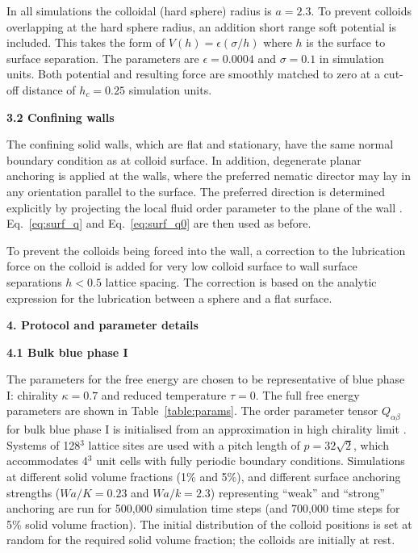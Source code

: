 \documentclass[12pt,twoside]{article}
\begin{document}
In all simulations the colloidal (hard sphere) radius is $a = 2.3$. To
prevent colloids overlapping at the hard sphere radius, an addition
short range soft potential is included. This takes the form of
$V(h) = \epsilon (\sigma/h)$ where $h$ is the surface to surface separation.
The parameters are $\epsilon = 0.0004$ and $\sigma = 0.1$ in simulation
units. Both potential and resulting force are smoothly matched to zero at
a cut-off distance of $h_c = 0.25$ simulation units.

{\bf 3.2 Confining walls}

The confining solid walls, which are flat and stationary, have the
same normal boundary condition as at colloid surface. In addition,
degenerate planar anchoring is applied at the walls, where the
preferred nematic director may lay in any orientation parallel
to the surface. The preferred direction is determined explicitly
by projecting the local fluid order parameter to the plane of the
wall \cite{fournier2005}. Eq.~\ref{eq:surf_q} and Eq.~\ref{eq:surf_q0}
are then used as before.

To prevent the colloids being forced into the wall, a correction
to the lubrication force on the colloid is added for very low colloid
surface to wall surface separations $h < 0.5$ lattice spacing. The
correction is based on the analytic expression for the lubrication
between a sphere and a flat surface.

{\bf 4. Protocol and parameter details}


{\bf 4.1 Bulk blue phase I}

The parameters for the free energy are chosen to be representative
of blue phase I: chirality $\kappa = 0.7$ and reduced temperature
$\tau = 0$.
The full free energy parameters are shown in Table~\ref{table:params}.
The order parameter tensor $Q_{\alpha\beta}$ for bulk blue phase I is
initialised from an approximation in high chirality limit
\cite{blue1,oliver1}. Systems of 128$^3$ lattice sites are
used with a pitch length of $p = 32\sqrt{2}$, which accommodates 4$^3$
unit cells with fully periodic boundary conditions.
Simulations at
different solid volume fractions (1\% and 5\%), and different surface
anchoring strengths ($Wa/K = 0.23$ and $Wa/k = 2.3$) representing
``weak'' and ``strong'' anchoring are run for 500,000 simulation
time steps (and 700,000 time steps for 5\% solid volume fraction).
The initial distribution of the colloid positions is set at random
for the required solid volume fraction; the colloids are initially
at rest.
\end{document}
